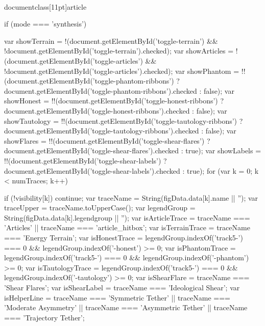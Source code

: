 \\documentclass[11pt]{article}
\begin{document}
\begin{CodeBlock}
{{{{{{{{            if (mode === 'synthesis') {{
                var showTerrain = !(document.getElementById('toggle-terrain') && !document.getElementById('toggle-terrain').checked);
                var showArticles = !(document.getElementById('toggle-articles') && !document.getElementById('toggle-articles').checked);
                var showPhantom = !!(document.getElementById('toggle-phantom-ribbons') ? document.getElementById('toggle-phantom-ribbons').checked : false);
                var showHonest = !!(document.getElementById('toggle-honest-ribbons') ? document.getElementById('toggle-honest-ribbons').checked : false);
                var showTautology = !!(document.getElementById('toggle-tautology-ribbons') ? document.getElementById('toggle-tautology-ribbons').checked : false);
                var showFlares = !!(document.getElementById('toggle-shear-flares') ? document.getElementById('toggle-shear-flares').checked : true);
                var showLabels = !!(document.getElementById('toggle-shear-labels') ? document.getElementById('toggle-shear-labels').checked : true);
                for (var k = 0; k < numTraces; k++) {{
                    if (!visibility[k]) continue;
                    var traceName = String(figData.data[k].name || '');
                    var traceUpper = traceName.toUpperCase();
                    var legendGroup = String(figData.data[k].legendgroup || '');
                    var isArticleTrace = traceName === 'Articles' || traceName === 'article_hitbox';
                    var isTerrainTrace = traceName === 'Energy Terrain';
                    var isHonestTrace = legendGroup.indexOf('track5-') === 0 && legendGroup.indexOf('-honest') >= 0;
                    var isPhantomTrace = legendGroup.indexOf('track5-') === 0 && legendGroup.indexOf('-phantom') >= 0;
                    var isTautologyTrace = legendGroup.indexOf('track5-') === 0 && legendGroup.indexOf('-tautology') >= 0;
                    var isShearFlare = traceName === 'Shear Flares';
                    var isShearLabel = traceName === 'Ideological Shear';
                    var isHelperLine = traceName === 'Symmetric Tether' || traceName === 'Moderate Asymmetry' || traceName === 'Asymmetric Tether' || traceName === 'Trajectory Tether';

}}}}}}}}}}}}
\end{CodeBlock}
\end{document}
